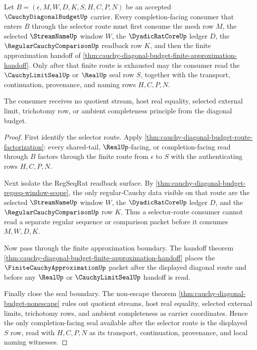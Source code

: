 \begin{theorem}
\label{thm:cauchy-diagonal-budget-selector-regseqrat-seal-exhaustion}
Let $B=(\epsilon,M,W,D,K,S,H,C,P,N)$ be an accepted $\CauchyDiagonalBudgetUp$ carrier. Every completion-facing consumer that enters $B$ through the selector route must first consume the mesh row $M$, the selected $\StreamNameUp$ window $W$, the $\DyadicRatCoreUp$ ledger $D$, the $\RegularCauchyComparisonUp$ readback row $K$, and then the finite approximation handoff of \autoref{thm:cauchy-diagonal-budget-finite-approximation-handoff}. Only after that finite route is exhausted may the consumer read the $\CauchyLimitSealUp$ or $\RealUp$ seal row $S$, together with the transport, continuation, provenance, and naming rows $H,C,P,N$.

The consumer receives no quotient stream, host real equality, selected external limit, trichotomy row, or ambient completeness principle from the diagonal budget.
\end{theorem}
\begin{proof}
First identify the selector route. Apply \autoref{thm:cauchy-diagonal-budget-route-factorization}: every shared-tail, $\RealUp$-facing, or completion-facing read through $B$ factors through the finite route from $\epsilon$ to $S$ with the authenticating rows $H,C,P,N$.

Next isolate the RegSeqRat readback surface. By \autoref{thm:cauchy-diagonal-budget-regseq-window-scope}, the only regular-Cauchy data visible on that route are the selected $\StreamNameUp$ window $W$, the $\DyadicRatCoreUp$ ledger $D$, and the $\RegularCauchyComparisonUp$ row $K$. Thus a selector-route consumer cannot read a separate regular sequence or comparison packet before it consumes $M,W,D,K$.

Now pass through the finite approximation boundary. The handoff theorem \autoref{thm:cauchy-diagonal-budget-finite-approximation-handoff} places the $\FiniteCauchyApproximationUp$ packet after the displayed diagonal route and before any $\RealUp$ or $\CauchyLimitSealUp$ handoff is read.

Finally close the seal boundary. The non-escape theorem \autoref{thm:cauchy-diagonal-budget-nonescape} rules out quotient streams, host real equality, selected external limits, trichotomy rows, and ambient completeness as carrier coordinates. Hence the only completion-facing seal available after the selector route is the displayed $S$ row, read with $H,C,P,N$ as its transport, continuation, provenance, and local naming witnesses.
\end{proof}

